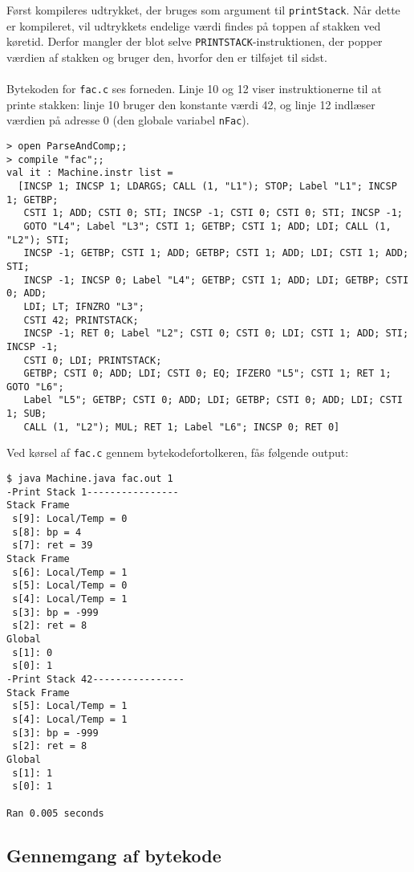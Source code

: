 Først kompileres udtrykket, der bruges som argument til \texttt{printStack}. Når dette er kompileret, vil udtrykkets endelige værdi findes på toppen af stakken ved køretid. Derfor mangler der blot selve \texttt{PRINTSTACK}-instruktionen, der popper værdien af stakken og bruger den, hvorfor den er tilføjet til sidst.
\\\\
Bytekoden for \texttt{fac.c} ses forneden. Linje 10 og 12 viser instruktionerne til at printe stakken: linje 10 bruger den konstante værdi 42, og linje 12 indlæser værdien på adresse 0 (den globale variabel \texttt{nFac}).

\begin{verbatim}
> open ParseAndComp;;
> compile "fac";;
val it : Machine.instr list =
  [INCSP 1; INCSP 1; LDARGS; CALL (1, "L1"); STOP; Label "L1"; INCSP 1; GETBP;
   CSTI 1; ADD; CSTI 0; STI; INCSP -1; CSTI 0; CSTI 0; STI; INCSP -1;
   GOTO "L4"; Label "L3"; CSTI 1; GETBP; CSTI 1; ADD; LDI; CALL (1, "L2"); STI;
   INCSP -1; GETBP; CSTI 1; ADD; GETBP; CSTI 1; ADD; LDI; CSTI 1; ADD; STI;
   INCSP -1; INCSP 0; Label "L4"; GETBP; CSTI 1; ADD; LDI; GETBP; CSTI 0; ADD;
   LDI; LT; IFNZRO "L3";
   CSTI 42; PRINTSTACK;
   INCSP -1; RET 0; Label "L2"; CSTI 0; CSTI 0; LDI; CSTI 1; ADD; STI; INCSP -1;
   CSTI 0; LDI; PRINTSTACK;
   GETBP; CSTI 0; ADD; LDI; CSTI 0; EQ; IFZERO "L5"; CSTI 1; RET 1; GOTO "L6";
   Label "L5"; GETBP; CSTI 0; ADD; LDI; GETBP; CSTI 0; ADD; LDI; CSTI 1; SUB;
   CALL (1, "L2"); MUL; RET 1; Label "L6"; INCSP 0; RET 0]
\end{verbatim}

Ved kørsel af \texttt{fac.c} gennem bytekodefortolkeren, fås følgende output:

\begin{verbatim}
$ java Machine.java fac.out 1
-Print Stack 1----------------
Stack Frame
 s[9]: Local/Temp = 0
 s[8]: bp = 4
 s[7]: ret = 39
Stack Frame
 s[6]: Local/Temp = 1
 s[5]: Local/Temp = 0
 s[4]: Local/Temp = 1
 s[3]: bp = -999
 s[2]: ret = 8
Global
 s[1]: 0
 s[0]: 1
-Print Stack 42----------------
Stack Frame
 s[5]: Local/Temp = 1
 s[4]: Local/Temp = 1
 s[3]: bp = -999
 s[2]: ret = 8
Global
 s[1]: 1
 s[0]: 1

Ran 0.005 seconds
\end{verbatim}

\subsection{Gennemgang af bytekode}

